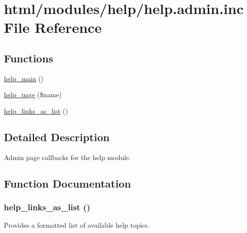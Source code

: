 \hypertarget{help_8admin_8inc}{
\section{html/modules/help/help.admin.inc File Reference}
\label{help_8admin_8inc}
}
\subsection*{Functions}
\begin{DoxyCompactItemize}
\item 
\hyperlink{help_8admin_8inc_a88c3f4bd225be1ceb6e8e4cdbb788999}{help\_\-main} ()
\item 
\hyperlink{help_8admin_8inc_af233fe63b8d02f02d9a68c9ef5b09b7e}{help\_\-page} (\$name)
\item 
\hyperlink{help_8admin_8inc_a1926fc2a19433d20f1b91879796faa84}{help\_\-links\_\-as\_\-list} ()
\end{DoxyCompactItemize}


\subsection{Detailed Description}
Admin page callbacks for the help module. 

\subsection{Function Documentation}
\hypertarget{help_8admin_8inc_a1926fc2a19433d20f1b91879796faa84}{
\subsubsection[{help\_\-links\_\-as\_\-list}]{\setlength{\rightskip}{0pt plus 5cm}help\_\-links\_\-as\_\-list ()}}
\label{help_8admin_8inc_a1926fc2a19433d20f1b91879796faa84}
Provides a formatted list of available help topics.

